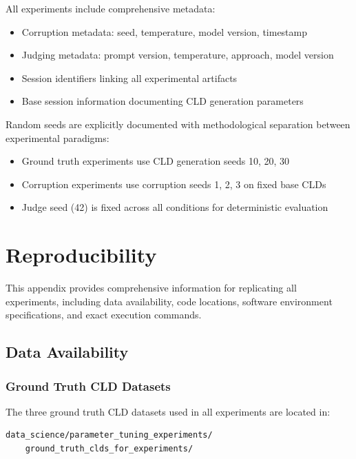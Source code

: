\documentclass{article}
\begin{document}
All experiments include comprehensive metadata:
\begin{itemize}
    \item Corruption metadata: seed, temperature, model version, timestamp
    \item Judging metadata: prompt version, temperature, approach, model version
    \item Session identifiers linking all experimental artifacts
    \item Base session information documenting CLD generation parameters
\end{itemize}

Random seeds are explicitly documented with methodological separation between experimental paradigms:
\begin{itemize}
    \item Ground truth experiments use CLD generation seeds 10, 20, 30
    \item Corruption experiments use corruption seeds 1, 2, 3 on fixed base CLDs
    \item Judge seed (42) is fixed across all conditions for deterministic evaluation
\end{itemize}

\appendix

\section{Reproducibility}
\label{sec:reproducibility}

This appendix provides comprehensive information for replicating all experiments, including data availability, code locations, software environment specifications, and exact execution commands.

\subsection{Data Availability}
\label{sec:data_availability}

\subsubsection{Ground Truth CLD Datasets}

The three ground truth CLD datasets used in all experiments are located in:
\begin{verbatim}
data_science/parameter_tuning_experiments/
    ground_truth_clds_for_experiments/
\end{verbatim}
\end{document}
